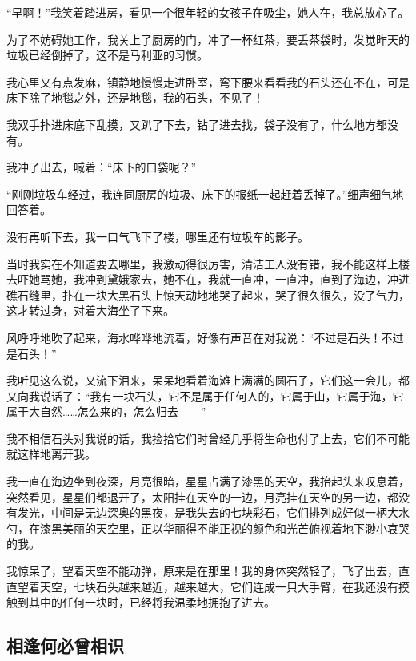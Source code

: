 \par “早啊！”我笑着踏进房，看见一个很年轻的女孩子在吸尘，她人在，我总放心了。
\par 为了不妨碍她工作，我关上了厨房的门，冲了一杯红茶，要丢茶袋时，发觉昨天的垃圾已经倒掉了，这不是马利亚的习惯。
\par 我心里又有点发麻，镇静地慢慢走进卧室，弯下腰来看看我的石头还在不在，可是床下除了地毯之外，还是地毯，我的石头，不见了！
\par 我双手扑进床底下乱摸，又趴了下去，钻了进去找，袋子没有了，什么地方都没有。
\par 我冲了出去，喊着：“床下的口袋呢？”
\par “刚刚垃圾车经过，我连同厨房的垃圾、床下的报纸一起赶着丢掉了。”细声细气地回答着。
\par 没有再听下去，我一口气飞下了楼，哪里还有垃圾车的影子。
\par 当时我实在不知道要去哪里，我激动得很厉害，清洁工人没有错，我不能这样上楼去吓她骂她，我冲到黛娥家去，她不在，我就一直冲，一直冲，直到了海边，冲进礁石缝里，扑在一块大黑石头上惊天动地地哭了起来，哭了很久很久，没了气力，这才转过身，对着大海坐了下来。
\par 风呼呼地吹了起来，海水哗哗地流着，好像有声音在对我说：“不过是石头！不过是石头！”
\par 我听见这么说，又流下泪来，呆呆地看着海滩上满满的圆石子，它们这一会儿，都又向我说话了：“我有一块石头，它不是属于任何人的，它属于山，它属于海，它属于大自然……怎么来的，怎么归去——”
\par 我不相信石头对我说的话，我捡拾它们时曾经几乎将生命也付了上去，它们不可能就这样地离开我。
\par 我一直在海边坐到夜深，月亮很暗，星星占满了漆黑的天空，我抬起头来叹息着，突然看见，星星们都退开了，太阳挂在天空的一边，月亮挂在天空的另一边，都没有发光，中间是无边深奥的黑夜，是我失去的七块彩石，它们排列成好似一柄大水勺，在漆黑美丽的天空里，正以华丽得不能正视的颜色和光芒俯视着地下渺小哀哭的我。
\par 我惊呆了，望着天空不能动弹，原来是在那里！我的身体突然轻了，飞了出去，直直望着天空，七块石头越来越近，越来越大，它们连成一只大手臂，在我还没有摸触到其中的任何一块时，已经将我温柔地拥抱了进去。






\subsection{相逢何必曾相识}


